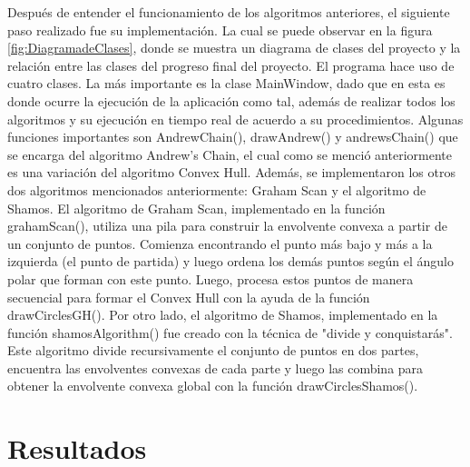 \documentclass[conference]{IEEEtran}
\begin{document}
Después de entender el funcionamiento de los algoritmos anteriores, el siguiente paso realizado fue su implementación. La cual se puede observar en la figura \ref{fig:DiagramadeClases}, donde se muestra un diagrama de clases del proyecto y la relación entre las clases del progreso final del proyecto. El programa hace uso de cuatro clases. La más importante es la clase MainWindow, dado que en esta es donde ocurre la ejecución de la aplicación como tal, además de realizar todos los algoritmos y su ejecución en tiempo real de acuerdo a su procedimientos. Algunas funciones importantes son AndrewChain(), drawAndrew() y andrewsChain() que se encarga del algoritmo Andrew’s Chain, el cual como se menció anteriormente es una variación del algoritmo Convex Hull.
Además, se implementaron los otros dos algoritmos mencionados anteriormente: Graham Scan y el algoritmo de Shamos. El algoritmo de Graham Scan, implementado en la función grahamScan(), utiliza una pila para construir la envolvente convexa a partir de un conjunto de puntos. Comienza encontrando el punto más bajo y más a la izquierda (el punto de partida) y luego ordena los demás puntos según el ángulo polar que forman con este punto. Luego, procesa estos puntos de manera secuencial para formar el Convex Hull con la ayuda de la función drawCirclesGH().
Por otro lado, el algoritmo de Shamos, implementado en la función shamosAlgorithm() fue creado con la técnica de "divide y conquistarás". Este algoritmo divide recursivamente el conjunto de puntos en dos partes, encuentra las envolventes convexas de cada parte y luego las combina para obtener la envolvente convexa global con la función drawCirclesShamos().



\section{Resultados}
\end{document}
